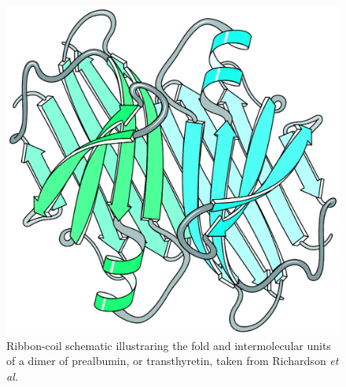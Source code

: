 \begin{figure}[ht]
\centering
\includegraphics[scale=0.4]{Chapter1/overallfold.png}
\caption{Ribbon-coil schematic illustraring the fold and
  intermolecular units of a dimer of prealbumin, or
transthyretin, taken from Richardson \textit{et al.} \cite{richardson2002}}
\end{figure}

